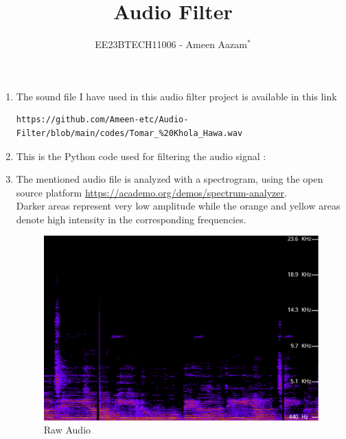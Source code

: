 \documentclass[journal,12pt,twocolumn]{IEEEtran}
\theoremstyle{remark}
\begin{document}

\vspace{3cm}
\title{Audio Filter}
\author{EE23BTECH11006 - Ameen Aazam$^{*}$%
}
\maketitle
\newpage
\bigskip
\renewcommand{\thefigure}{\arabic{figure}}
\renewcommand{\thetable}{\theenumi}


\begin{enumerate}[label=\thesection.\arabic*
,ref=\thesection.\theenumi]
\section{Digital Filter}
\label{input_sound}
\item The sound file I have used in this audio filter project is available in this link
\begin{lstlisting}
https://github.com/Ameen-etc/Audio-Filter/blob/main/codes/Tomar_%20Khola_Hawa.wav
\end{lstlisting}
\item 
\label{Python code}
This is the Python code used for filtering the audio signal :

\item \label{Spectrum}
The mentioned audio file is analyzed with a spectrogram, using the open source platform \href{https://academo.org/demos/spectrum-analyzer}{\url{https://academo.org/demos/spectrum-analyzer}}.\\
Darker areas represent very low amplitude while the orange and yellow areas denote high intensity in the corresponding frequencies.
\begin{figure}[h!]
    \centering
    \includegraphics[width=0.7\columnwidth]{figs/test_sig.png}
    \caption{Raw Audio}
    \label{fig:raw_file}
\end{figure}

\end{enumerate}
\end{document}

